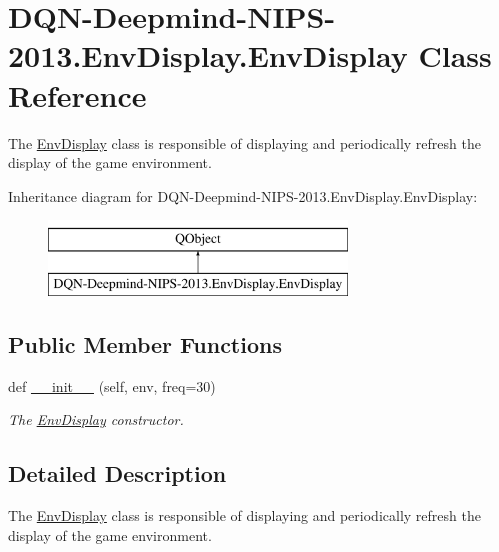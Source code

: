 \hypertarget{classDQN-Deepmind-NIPS-2013_1_1EnvDisplay_1_1EnvDisplay}{}\section{D\+Q\+N-\/\+Deepmind-\/\+N\+I\+P\+S-\/2013.Env\+Display.\+Env\+Display Class Reference}
\label{classDQN-Deepmind-NIPS-2013_1_1EnvDisplay_1_1EnvDisplay}


The \hyperlink{classDQN-Deepmind-NIPS-2013_1_1EnvDisplay_1_1EnvDisplay}{Env\+Display} class is responsible of displaying and periodically refresh the display of the game environment.  


Inheritance diagram for D\+Q\+N-\/\+Deepmind-\/\+N\+I\+P\+S-\/2013.Env\+Display.\+Env\+Display\+:\begin{figure}[H]
\begin{center}
\leavevmode
\includegraphics[height=2.000000cm]{classDQN-Deepmind-NIPS-2013_1_1EnvDisplay_1_1EnvDisplay}
\end{center}
\end{figure}
\subsection*{Public Member Functions}
\begin{DoxyCompactItemize}
\item 
def \hyperlink{classDQN-Deepmind-NIPS-2013_1_1EnvDisplay_1_1EnvDisplay_ad60e1788026fe76998cc85b558d9311f}{\+\_\+\+\_\+init\+\_\+\+\_\+} (self, env, freq=30)
\begin{DoxyCompactList}\small\item\em The \hyperlink{classDQN-Deepmind-NIPS-2013_1_1EnvDisplay_1_1EnvDisplay}{Env\+Display} constructor. \end{DoxyCompactList}\end{DoxyCompactItemize}


\subsection{Detailed Description}
The \hyperlink{classDQN-Deepmind-NIPS-2013_1_1EnvDisplay_1_1EnvDisplay}{Env\+Display} class is responsible of displaying and periodically refresh the display of the game environment. 

